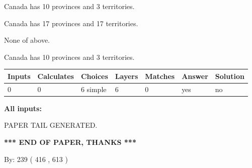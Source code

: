 \documentclass[12pt]{article}
\begin{document}
 
Canada has 10  provinces and 3 territories.
 
 
Canada has  17 provinces and  17 territories.
 
 
 None of above.
 
 
\noindent{}
 
 
Canada has 10  provinces and 3 territories.
 
 
\noindent{}
 
 
   
   
   
   
\noindent\begin{tabular}{|l|l|l|l|l|l|l|}
 \hline
Inputs & Calculates & Choices & Layers & Matches & Answer & Solution \\ \hline
 0  & 
 0  & 
 6
  simple  
  & 
 6  & 
 0  & 
  yes & 
  no 
  \\ \hline
 \end{tabular}
   
   
   
   
\noindent{}
   
   
   
   
\noindent\vspace{0.1in}\hspace{-0.08in} {\textbf{\Large{All inputs: }}}
   
   
   
   
   
   
 \vspace{0.2in}
 
   
   
\vspace{2.0in} PAPER TAIL GENERATED.
   
   
   
   
\vspace{1.0in} 
{\textbf{\large{ *** END OF PAPER, THANKS *** }}} 
   
   
\hspace{1.0in} By: 
 239 ( 416 ,  613 )
   
   
   
   
\newpage 
\setcounter{page}{ 
   493001 } 
   
   
   
\end{document}
